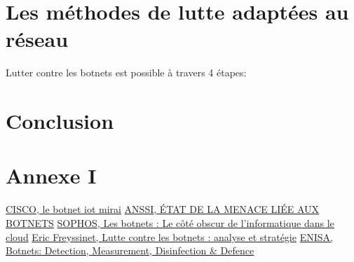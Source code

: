 \documentclass[a4paper]{article}
\begin{document}
\newpage\section{Les méthodes de lutte adaptées au réseau}
Lutter contre les botnets est possible à travers 4 étapes:





\newpage\section{Conclusion}
 

\newpage\section{Annexe I}
 

\newpage\begin{thebibliography}{breitestes Label}
 \href{run:Doc/botnet_iot_mirai_la_menace_clé_en_main_publique.pdf}{CISCO, le botnet iot mirai}
 \newline\href{run:Doc/CERTFR-2019-CTI-008}{ANSSI, ÉTAT DE LA MENACE LIÉE AUX BOTNETS}
 \newline\href{run:Doc/sophosbotnetswpna}{SOPHOS, Les botnets : Le côté obscur de l'informatique dans le cloud}
 \newline\href{run:Doc/these_archivage_3159144o}{Eric Freyssinet, Lutte contre les botnets : analyse et stratégie}
 \newline\href{run:Doc/ENISA_Botnets_Measurement_Defence}{ENISA, Botnets: Detection, Measurement, Disinfection \& Defence}
\end{thebibliography}
\end{document}
